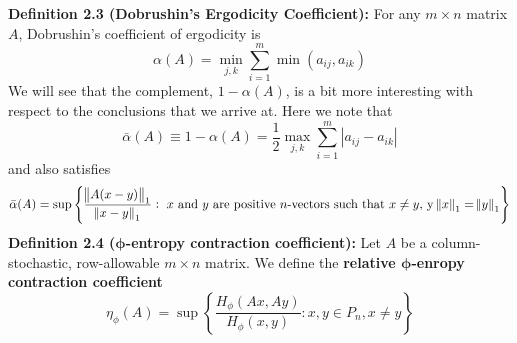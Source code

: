\noindent\textbf{Definition 2.3 (Dobrushin's Ergodicity Coefficient):} For any $m \times n$ matrix $A$, Dobrushin's coefficient of ergodicity is
\[\alpha(A) = \min_{j, k}\sum_{i = 1}^m \min(a_{ij},a_{ik})\] 
We will see that the complement, $1- \alpha(A)$, is a bit more interesting with respect to the conclusions that we arrive at. Here we note that 
\[\bar{\alpha}(A) \equiv 1 - \alpha(A) = \frac{1}{2} \max_{j,k}\sum_{i = 1}^m|a_{ij} - a_{ik}|\]
and also satisfies
\[\bar{\alpha}(A) = \sup \left\{\frac{\norm{A(x-y)}_1}{\norm{x-y}_1}: \text{ $x$ and $y$ are positive $n$-vectors such that } x\neq y, \, \text{y} \, \norm{x}_1 = \norm{y}_1\right\}\]
\textbf{Definition 2.4 ($\bm{\phi}$-entropy contraction coefficient):} Let $A$ be a column-stochastic, row-allowable $m \times n$ matrix. We define the \textbf{relative $\bm{\phi}$-enropy contraction coefficient} \[\eta_\phi (A) = \sup \left\{\frac{H_\phi(Ax, Ay)}{H_\phi(x,y)}: x,y \in P_n, x \neq y\right\}\]





